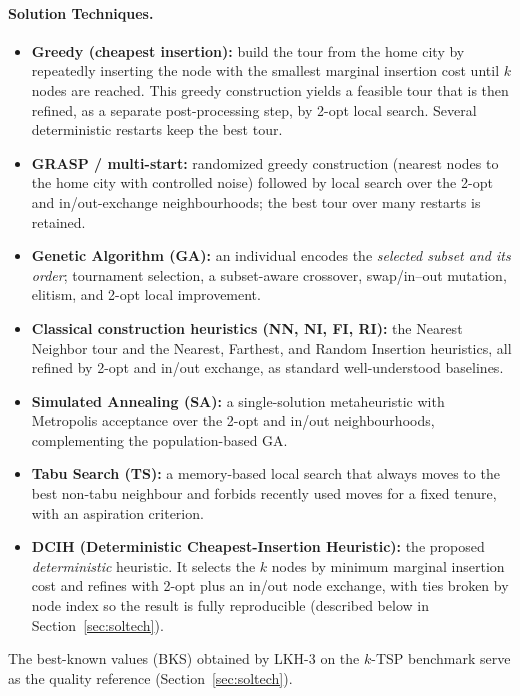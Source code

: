 \documentclass[conference]{IEEEtran}
\begin{document}
\paragraph{Solution Techniques.}
\begin{itemize}
  \item \textbf{Greedy (cheapest insertion):} build the tour from the home city by repeatedly inserting the node with the smallest marginal insertion cost until $k$ nodes are reached. This greedy construction yields a feasible tour that is then refined, as a separate post-processing step, by 2-opt local search. Several deterministic restarts keep the best tour.
  \item \textbf{GRASP / multi-start:} randomized greedy construction (nearest nodes to the home city with controlled noise) followed by local search over the 2-opt and in/out-exchange neighbourhoods; the best tour over many restarts is retained.
  \item \textbf{Genetic Algorithm (GA):} an individual encodes the \emph{selected subset and its order}; tournament selection, a subset-aware crossover, swap/in--out mutation, elitism, and 2-opt local improvement.
  \item \textbf{Classical construction heuristics (NN, NI, FI, RI):} the Nearest Neighbor tour and the Nearest, Farthest, and Random Insertion heuristics, all refined by 2-opt and in/out exchange, as standard well-understood baselines.
  \item \textbf{Simulated Annealing (SA):} a single-solution metaheuristic with Metropolis acceptance over the 2-opt and in/out neighbourhoods, complementing the population-based GA.
  \item \textbf{Tabu Search (TS):} a memory-based local search that always moves to the best non-tabu neighbour and forbids recently used moves for a fixed tenure, with an aspiration criterion.
  \item \textbf{DCIH (Deterministic Cheapest-Insertion Heuristic):} the proposed \emph{deterministic} heuristic. It selects the $k$ nodes by minimum marginal insertion cost and refines with 2-opt plus an in/out node exchange, with ties broken by node index so the result is fully reproducible (described below in Section~\ref{sec:soltech}).
\end{itemize}
The best-known values (BKS) obtained by LKH-3 on the $k$-TSP benchmark serve as the quality reference (Section~\ref{sec:soltech}).
\end{document}
